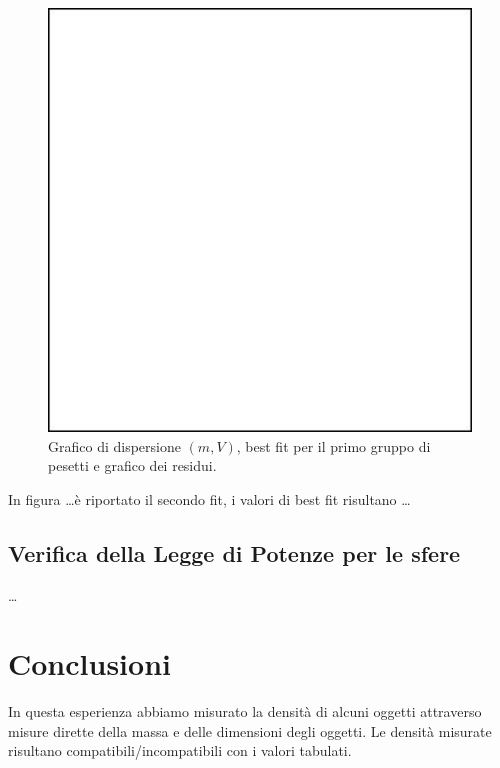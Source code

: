 \documentclass[a4paper]{article}
\begin{document}
\begin{figure}
    \centering
     \includegraphics[width=0.5\linewidth]{blankfig.pdf}
    \caption{Grafico di dispersione $(m,V)$, best fit per il primo gruppo di pesetti e grafico dei residui.}
    \label{fig:densita1}
\end{figure}

In figura \ldots  \`e riportato il secondo fit, i valori di best fit risultano \ldots

\subsection{Verifica della Legge di Potenze per le sfere}

\ldots

\section{Conclusioni}
In questa esperienza abbiamo misurato la densit\`a di alcuni oggetti attraverso misure dirette della massa e delle dimensioni degli oggetti. Le densit\`a misurate risultano compatibili/incompatibili con i valori tabulati.
\end{document}

